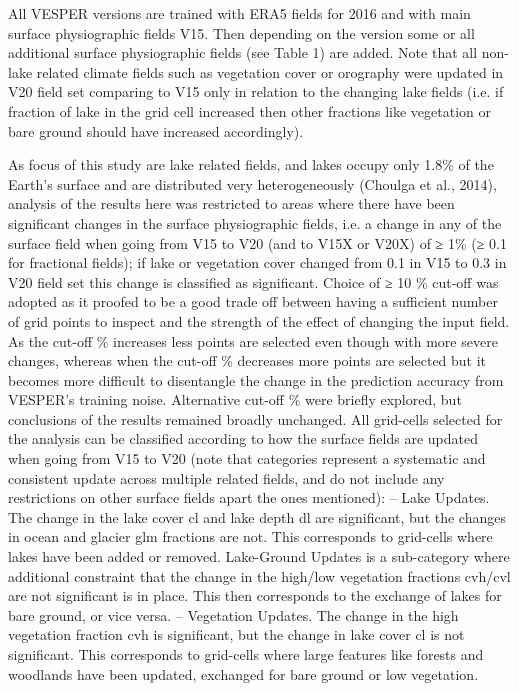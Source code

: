 \documentclass[hess, manuscript]{copernicus}
\begin{document}
All VESPER versions are trained with ERA5 fields for 2016 and with main surface physiographic fields V15. Then depending on the version some or all additional surface physiographic fields (see Table 1) are added. Note that all non-lake related climate fields such as vegetation cover or orography were updated in V20 field set comparing to V15 only in relation to the changing lake fields (i.e. if fraction of lake in the grid cell increased then other fractions like vegetation or bare ground should have increased accordingly). 

As focus of this study are lake related fields, and lakes occupy only 1.8\% of the Earth’s surface and are distributed very heterogeneously (Choulga et al., 2014), analysis of the results here was restricted to areas where there have been significant changes in the surface physiographic fields, i.e. a change in any of the surface field when going from V15 to V20 (and to V15X or V20X) of ≥ 1\% (≥ 0.1 for fractional fields); if lake or vegetation cover changed from 0.1 in V15 to 0.3 in V20 field set this change is classified as significant. Choice of ≥ 10 \% cut-off was adopted as it proofed to be a good trade off between having a sufficient number of grid points to inspect and the strength of the effect of changing the input field. As the cut-off \% increases less points are selected even though with more severe changes, whereas when the cut-off \% decreases more points are selected but it becomes more difficult to disentangle the change in the prediction accuracy from VESPER’s training noise. Alternative cut-off \% were briefly explored, but conclusions of the results remained broadly unchanged. All grid-cells selected for the analysis can be classified according to how the surface fields are updated when going from V15 to V20 (note that categories represent a systematic and consistent update across multiple related fields, and do not include any restrictions on other surface fields apart the ones mentioned):
– Lake Updates. The change in the lake cover cl and lake depth dl are significant, but the changes in ocean and glacier glm fractions are not. This corresponds to grid-cells where lakes have been added or removed. Lake-Ground Updates is a sub-category where additional constraint that the change in the high/low vegetation fractions cvh/cvl are not significant is in place. This then corresponds to the exchange of lakes for bare ground, or vice versa.
– Vegetation Updates. The change in the high vegetation fraction cvh is significant, but the change in lake cover cl is not significant. This corresponds to grid-cells where large features like forests and woodlands have been updated, exchanged for bare ground or low vegetation.
\end{document}
